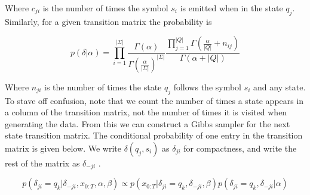 \documentclass[11pt]{article}
\begin{document}
 Where $c_{ji}$ is the number of times the symbol $s_i$ is emitted when in the state $q_j$.  Similarly, for a given transition matrix the probability is
 
 \[ p(\delta|\alpha) = \prod_{i=1}^{|\Sigma|} \frac{\Gamma(\alpha)}{\Gamma(\frac{\alpha}{|\Sigma|})^{|\Sigma|}} \frac{\prod_{j=1}^{|Q|}\Gamma(\frac{\alpha}{|Q|} + n_{ij})}{\Gamma(\alpha + |Q|)} \]
 
 Where $n_{ji}$ is the number of times the state $q_j$ follows the symbol $s_i$ and any state.  To stave off confusion, note that we count the number of times a state appears in a column of the transition matrix, not the number of times it is visited when generating the data.  From this we can construct a Gibbs sampler for the next state transition matrix.  The conditional probability of one entry in the transition matrix is given below.  We write $\delta(q_j,s_i)$ as $\delta_{ji}$ for compactness, and write the rest of the matrix as $\delta_{-ji}$ .
 
 \[ p(\delta_{ji} = q_k | \delta_{-ji},x_{0:T},\alpha,\beta) \propto p(x_{0:T}|\delta_{ji}=q_k,\delta_{-ji},\beta) p(\delta_{ji}=q_k,\delta_{-ji}|\alpha) \]


\end{document}

